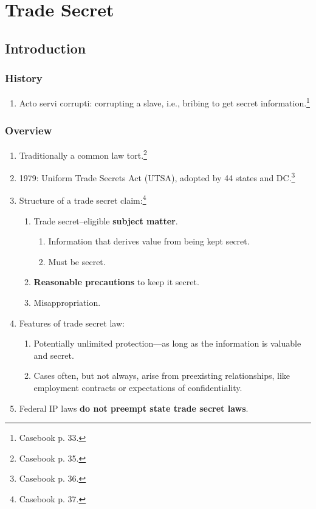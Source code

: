 \section{Trade Secret}

\subsection{Introduction}

\subsubsection{History}

\begin{enumerate}
    \item Acto servi corrupti: corrupting a slave, i.e., bribing to get secret 
    information.\footnote{Casebook p. 33.}
\end{enumerate}

\subsubsection{Overview}

\begin{enumerate}
    \item Traditionally a common law tort.\footnote{Casebook p. 35.}
    \item 1979: Uniform Trade Secrets Act (UTSA), adopted by 44 states and 
    DC.\footnote{Casebook p. 36.}
    \item Structure of a trade secret claim:\footnote{Casebook p. 37.
    }
    \begin{enumerate}
        \item Trade secret--eligible \textbf{subject matter}.
        \begin{enumerate}
            \item Information that derives value from being kept secret.
            \item Must be secret.
        \end{enumerate}
        \item \textbf{Reasonable precautions} to keep it secret.
        \item Misappropriation.
    \end{enumerate}
    \item Features of trade secret law:
    \begin{enumerate}
        \item Potentially unlimited protection---as long as the information is 
        valuable and secret.
        \item Cases often, but not always, arise from preexisting 
        relationships, like employment contracts or expectations of 
        confidentiality.
    \end{enumerate}
    \item Federal IP laws \textbf{do not preempt state trade secret laws}.
\end{enumerate}

